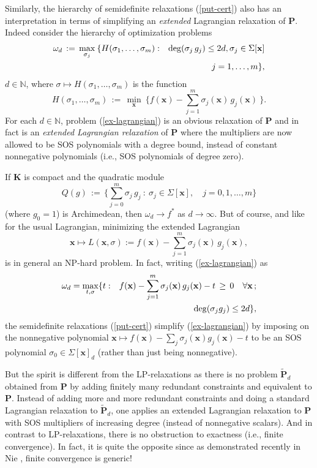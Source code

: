 \documentclass[11pt]{article}
\numberwithin{equation}{section}
\def\x{\mathbf{x}}
\def\R{\mathbb{R}}
\def\N{\mathbb{N}}
\def\K{\mathbf{K}}
\def\P{\mathbf{P}}
\begin{document}
Similarly, the hierarchy of semidefinite relaxations (\ref{put-cert}) also has an interpretation 
in terms of simplifying an {\it extended} Lagrangian relaxation of $\P$. 
Indeed consider the hierarchy of optimization problems
\begin{eqnarray}
\nonumber
\omega_d\,:=\,\max_{\sigma_j}\:\{H(\sigma_1,\ldots,\sigma_m)&:&
{\rm deg}(\sigma_j\,g_j)\leq 2d,\sigma_j\in\Sigma[\x]\\
\label{ex-lagrangian}
&&j=1,\ldots,m\},
\end{eqnarray}
$d\in\N$, where $\sigma\mapsto H(\sigma_1,\ldots,\sigma_m)$ is the function
\[H(\sigma_1,\ldots,\sigma_m)\,:=\,\min_\x\:\{f(\x)-\sum_{j=1}^m\sigma_j(\x)\,g_j(\x)\:\}.\]
For each $d\in\N$, problem (\ref{ex-lagrangian}) is an obvious relaxation of $\P$ and in fact 
is an {\it extended Lagrangian relaxation} of $\P$ where the multipliers are now allowed to be SOS 
polynomials with a degree bound, instead of constant nonnegative polynomials (i.e., SOS polynomials of degree zero).

If $\K$ is compact and the quadratic module %
\[Q(g)\,:=\,\{\sum_{j=0}^m\sigma_j\,g_j\::\:\sigma_j\in\Sigma[\x],\quad j=0,1,\ldots,m\}\]
(where $g_0=1$) is Archimedean, then $\omega_d\to f^*$ as $d\to\infty$. But of course,
and like for the usual Lagrangian, minimizing the extended Lagrangian
\[\x\mapsto L(\x,\sigma):=f(\x)-\sum_{j=1}^m\sigma_j(\x)\,g_j(\x),\]
 is in general an NP-hard problem. In fact, writing (\ref{ex-lagrangian}) as
 \begin{eqnarray*}
 \omega_d=\max_{t,\sigma}\{t&:&f(\x)-\sum_{j=1}^m\sigma_j(\x)\,g_j(\x)-t\,\geq\,0\quad\forall\x\,;\\
 &&{\rm deg}(\sigma_jg_j)\leq 2d\},\end{eqnarray*}
 the semidefinite relaxations (\ref{put-cert}) simplify
 (\ref{ex-lagrangian}) by imposing on the nonnegative polynomial
 $\x\mapsto f(\x)-\sum_j\sigma_j(\x)g_j(\x)-t$ to be an SOS polynomial $\sigma_0\in\Sigma[\x]_d$
 (rather than just being nonnegative).
 
 But the spirit is different from the LP-relaxations as there is no problem $\tilde{\P}_d$ obtained from $\P$
 by adding
finitely many  redundant constraints and equivalent to $\P$. Instead of adding more and more redundant constraints
 and doing a standard Lagrangian relaxation to $\tilde{\P}_d$, one applies an extended Lagrangian relaxation to 
 $\P$ with SOS multipliers of increasing degree (instead of nonnegative scalars). And in contrast to
 LP-relaxations, there is no obstruction to exactness (i.e., finite convergence). In fact, it is quite the opposite since
 as demonstrated recently in Nie \cite{nie2012}, finite convergence is generic!
 
\end{document}
